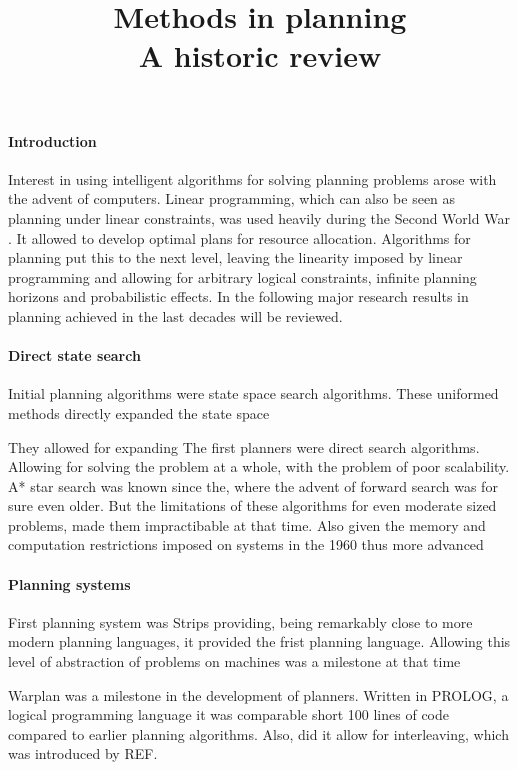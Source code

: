 \documentclass{article}
\begin{document}
\title{Methods in planning  \\ A historic review}

\paragraph*{Introduction}

Interest in using intelligent algorithms for solving planning problems arose
with the advent of computers. Linear programming, which can also be seen as
planning under linear constraints, was used heavily during the Second World War
\cite{linear_prog}.
It allowed to develop optimal plans for resource allocation. Algorithms for
planning put this to the next level, leaving the linearity imposed by linear
programming and allowing for arbitrary logical constraints, infinite planning
horizons and probabilistic effects. In the following major research results in
planning achieved in the last decades will be reviewed.

\paragraph*{Direct state search}

Initial planning algorithms were state space search algorithms. These uniformed
methods directly expanded the state space 

They allowed
for expanding 
The first planners were direct search algorithms. Allowing for solving the problem at a whole, with the problem of poor scalability. A* star search was known since the, where the advent of forward search was for sure even older. But the limitations of these algorithms for even moderate sized problems, made them impractibable at that time. Also given the memory and computation restrictions imposed on systems in the 1960 thus more advanced 

\paragraph*{Planning systems}

First planning system was Strips providing, being remarkably close to more modern planning languages, it provided the frist planning language. Allowing this level of abstraction of problems on machines was a milestone at that time

Warplan was a milestone in the development of planners. Written in PROLOG, a logical programming language it was comparable short 100 lines of code compared to earlier planning
algorithms. Also, did it allow for interleaving, which was introduced by REF. 
\end{document}
